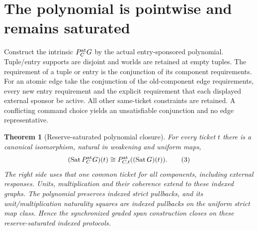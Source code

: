 \documentclass[11pt]{article}
\newtheorem{theorem}{Theorem}\newtheorem{lemma}{Lemma}
\begin{document}
\section{The polynomial is pointwise and remains saturated}
Construct the intrinsic $P_C^{\rm at}G$ by the actual entry-sponsored polynomial. Tuple/entry supports are disjoint and worlds are retained at empty tuples. The requirement of a tuple or entry is the conjunction of its component requirements. For an atomic edge take the conjunction of the old-component edge requirements, every new entry requirement and the explicit requirement that each displayed external sponsor be active. All other same-ticket constraints are retained. A conflicting command choice yields an unsatisfiable conjunction and no edge representative.

\begin{theorem}[Reserve-saturated polynomial closure]
For every ticket $t$ there is a canonical isomorphism, natural in weakening and uniform maps,
\[
 (\operatorname{Sat}P_C^{\rm at}G)(t)
          \cong P_{C,t}^{\rm at}((\operatorname{Sat}G)(t)). \tag{3}
\]
The right side uses that one common ticket for all components, including external responses. Units, multiplication and their coherence extend to these indexed graphs. The polynomial preserves indexed strict pullbacks, and its unit/multiplication naturality squares are indexed pullbacks on the uniform strict map class. Hence the synchronized graded span construction closes on these reserve-saturated indexed protocols.
\end{theorem}
\end{document}
